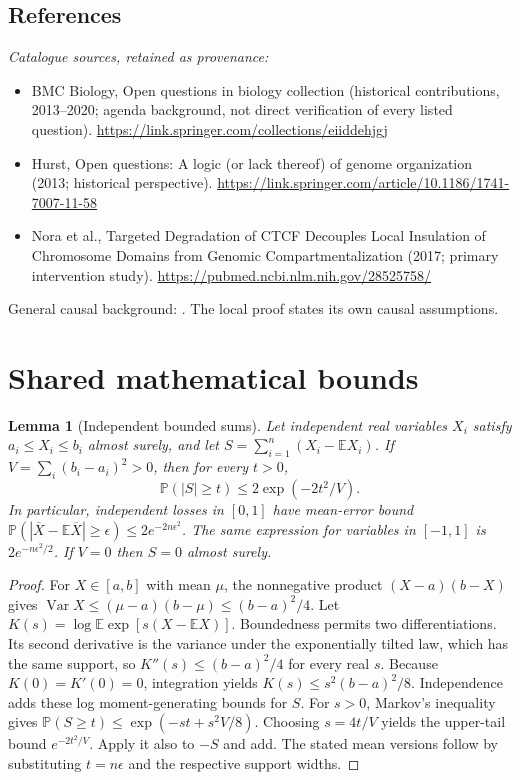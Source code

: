 \documentclass[11pt]{article}
\newcommand{\E}{\mathbb E}
\newcommand{\Prob}{\mathbb P}
\DeclareMathOperator{\Var}{Var}
\providecommand{\E}{\mathbb E}
\providecommand{\Prob}{\mathbb P}
\providecommand{\Var}{\operatorname{Var}}
\newtheorem{sharedlemma}{Lemma}[section]
\begin{document}
\subsection{References}
\noindent\emph{Catalogue sources, retained as provenance:}
\begin{itemize}
\item BMC Biology, Open questions in biology collection (historical contributions, 2013--2020; agenda background, not direct verification of every listed question). \url{https://link.springer.com/collections/eiiddehjgj}
\item Hurst, Open questions: A logic (or lack thereof) of genome organization (2013; historical perspective). \url{https://link.springer.com/article/10.1186/1741-7007-11-58}
\item Nora et al., Targeted Degradation of CTCF Decouples Local Insulation of Chromosome Domains from Genomic Compartmentalization (2017; primary intervention study). \url{https://pubmed.ncbi.nlm.nih.gov/28525758/}
\end{itemize}
\noindent General causal background: \cite{pearl}. The local proof states its own causal assumptions.
\clearpage


\appendix
\section{Shared mathematical bounds}\label{app:bounds}
\begin{sharedlemma}[Independent bounded sums]\label{lem:bounded}
Let independent real variables $X_i$ satisfy $a_i\leq X_i\leq b_i$ almost surely,
and let $S=\sum_{i=1}^n(X_i-\E X_i)$. If
$V=\sum_i(b_i-a_i)^2>0$, then for every $t>0$,
\[
 \Prob(|S|\geq t)\leq 2\exp(-2t^2/V).
\]
In particular, independent losses in $[0,1]$ have mean-error bound
$\Prob(|\overline X-\E\overline X|\geq\epsilon)
\leq2e^{-2n\epsilon^2}$. The same expression for variables in $[-1,1]$
is $2e^{-n\epsilon^2/2}$. If $V=0$ then $S=0$ almost surely.
\end{sharedlemma}
\begin{proof}
For $X\in[a,b]$ with mean $\mu$, the nonnegative product
$(X-a)(b-X)$ gives
$\Var X\leq(\mu-a)(b-\mu)\leq(b-a)^2/4$.
Let $K(s)=\log\E\exp[s(X-\E X)]$.
Boundedness permits two differentiations. Its second derivative is the variance
under the exponentially tilted law, which has the same support, so
$K''(s)\leq(b-a)^2/4$ for every real $s$.
Because $K(0)=K'(0)=0$, integration yields
$K(s)\leq s^2(b-a)^2/8$.
Independence adds these log moment-generating bounds for $S$.
For $s>0$, Markov's inequality gives
$\Prob(S\geq t)\leq\exp(-st+s^2V/8)$.
Choosing $s=4t/V$ yields the upper-tail bound $e^{-2t^2/V}$.
Apply it also to $-S$ and add. The stated mean versions follow by substituting
$t=n\epsilon$ and the respective support widths.
\end{proof}
\end{document}
